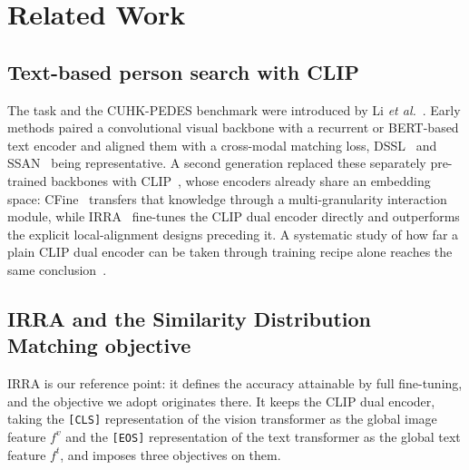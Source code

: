 \section{Related Work}\label{sec:related}

\subsection{Text-based person search with CLIP}

The task and the CUHK-PEDES benchmark were introduced by Li \textit{et al.}~\citep{li2017personsearchnaturallanguage}. Early methods paired a convolutional visual backbone with a recurrent or BERT-based text encoder and aligned them with a cross-modal matching loss, DSSL~\citep{Zhu_2021} and SSAN~\citep{ding2021semanticallyselfalignednetworktexttoimage} being representative. A second generation replaced these separately pre-trained backbones with CLIP~\citep{radford2021learningtransferablevisualmodels}, whose encoders already share an embedding space: CFine~\citep{yan2022clipdrivenfinegrainedtextimageperson} transfers that knowledge through a multi-granularity interaction module, while IRRA~\citep{jiang2023crossmodalimplicitrelationreasoning} fine-tunes the CLIP dual encoder directly and outperforms the explicit local-alignment designs preceding it. A systematic study of how far a plain CLIP dual encoder can be taken through training recipe alone reaches the same conclusion~\citep{cao2023empiricalstudycliptextbased}.

\subsection{IRRA and the Similarity Distribution Matching objective}\label{sec:irra}

IRRA is our reference point: it defines the accuracy attainable by full fine-tuning, and the objective we adopt originates there. It keeps the CLIP dual encoder, taking the \texttt{[CLS]} representation of the vision transformer as the global image feature $f^{v}$ and the \texttt{[EOS]} representation of the text transformer as the global text feature $f^{t}$, and imposes three objectives on them.

